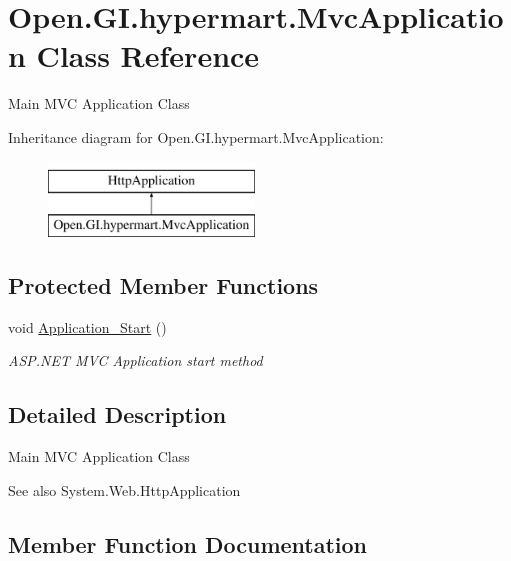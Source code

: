 \hypertarget{class_open_1_1_g_i_1_1hypermart_1_1_mvc_application}{}\section{Open.\+G\+I.\+hypermart.\+Mvc\+Application Class Reference}
\label{class_open_1_1_g_i_1_1hypermart_1_1_mvc_application}


Main M\+VC Application Class  


Inheritance diagram for Open.\+G\+I.\+hypermart.\+Mvc\+Application\+:\begin{figure}[H]
\begin{center}
\leavevmode
\includegraphics[height=2.000000cm]{class_open_1_1_g_i_1_1hypermart_1_1_mvc_application}
\end{center}
\end{figure}
\subsection*{Protected Member Functions}
\begin{DoxyCompactItemize}
\item 
void \hyperlink{class_open_1_1_g_i_1_1hypermart_1_1_mvc_application_a8169da76cd5c9b98983e4eee8d40ce4e}{Application\+\_\+\+Start} ()
\begin{DoxyCompactList}\small\item\em A\+S\+P.\+N\+ET M\+VC Application start method \end{DoxyCompactList}\end{DoxyCompactItemize}


\subsection{Detailed Description}
Main M\+VC Application Class 

\begin{DoxySeeAlso}{See also}
System.\+Web.\+Http\+Application


\end{DoxySeeAlso}


\subsection{Member Function Documentation}
\hypertarget{class_open_1_1_g_i_1_1hypermart_1_1_mvc_application_a8169da76cd5c9b98983e4eee8d40ce4e}{}\label{class_open_1_1_g_i_1_1hypermart_1_1_mvc_application_a8169da76cd5c9b98983e4eee8d40ce4e} 
